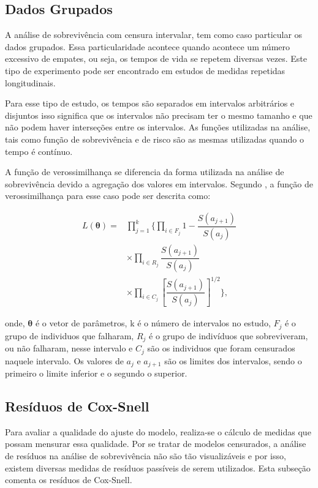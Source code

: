 \documentclass[a4paper,12pt]{article}
\begin{document}
\subsection{Dados Grupados}

A análise de sobrevivência com censura intervalar, tem como caso particular os dados grupados. Essa particularidade acontece quando acontece um número excessivo de empates, ou seja, os tempos de vida se repetem diversas vezes. Este tipo de experimento pode ser encontrado em estudos de medidas repetidas longitudinais.

Para esse tipo de estudo, os tempos são separados em intervalos arbitrários e disjuntos isso significa que os intervalos não precisam ter o mesmo tamanho e que não podem haver interseções entre os intervalos. As funções utilizadas na análise, tais como função de sobrevivência e de risco são as mesmas utilizadas quando o tempo é contínuo.

A função de verossimilhança se diferencia da forma utilizada na análise de sobrevivência devido a agregação dos valores em intervalos. Segundo \cite{elisangela}, a função de verossimilhança para esse caso pode ser descrita como:

\begin{equation} \label{eq:like_group}
  \begin{split}
    L(\boldsymbol{\theta})  =  &\prod\limits_{j=1}^k\Bigg\{ \prod\limits_{i\in F_j} 1 - \dfrac{S(a_{j+1})}{S(a_{j})} \\
    & \times \prod\limits_{i\in R_j} \dfrac{S(a_{j+1})}{S(a_{j})} \\
    & \times \prod\limits_{i\in C_j} \left[\dfrac{S(a_{j+1})}{S(a_{j})}\right]^{1/2}\Bigg\},
  \end{split}
\end{equation}

\noindent onde, $\boldsymbol{\theta}$ é o vetor de parâmetros, k é o número de intervalos no estudo, $F_j$ é o grupo de individuos que falharam, $R_j$ é o grupo de indivíduos que sobreviveram, ou não falharam, nesse intervalo e $C_j$ são os individuos que foram censurados naquele intervalo. Os valores de $a_j$ e $a_{j+1}$ são os limites dos intervalos, sendo o primeiro o limite inferior e o segundo o superior.

\subsection{Resíduos de Cox-Snell}

Para avaliar a qualidade do ajuste do modelo, realiza-se o cálculo de medidas que possam mensurar essa qualidade. Por se tratar de modelos censurados, a análise de resíduos na análise de sobrevivência não são tão visualizáveis e por isso, existem diversas medidas de resíduos passíveis de serem utilizados. Esta subseção comenta os resíduos de Cox-Snell.
\end{document}
